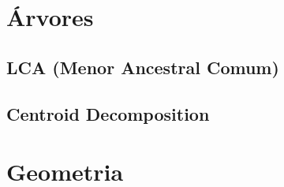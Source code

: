 % 


\section{Árvores}

\subsection{LCA (Menor Ancestral Comum)}


\subsection{Centroid Decomposition}


% 

% 


\section{Geometria}

% 

% 

% 

